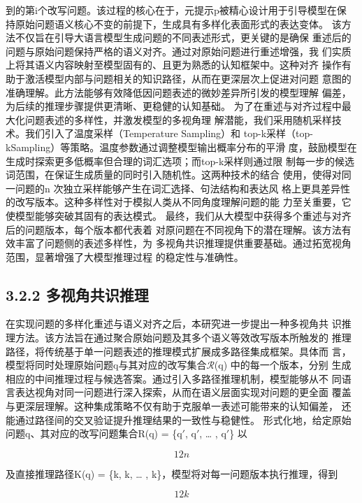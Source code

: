 \documentclass[12pt,a4paper,openright,UTF8]{ctexbook}
\begin{document}
到的第i个改写问题。该过程的核心在于，元提示p被精心设计用于引导模型在保 持原始问题语义核心不变的前提下，生成具有多样化表面形式的表达变体。 该方法不仅旨在引导大语言模型生成问题的不同表述形式，更关键的是确保 重述后的问题与原始问题保持严格的语义对齐。通过对原始问题进行重述增强，我 们实质上将其语义内容映射至模型固有的、且更为熟悉的认知框架中。这种对齐 操作有助于激活模型内部与问题相关的知识路径，从而在更深层次上促进对问题 意图的准确理解。此方法能够有效降低因问题表述的微妙差异所引发的模型理解 偏差，为后续的推理步骤提供更清晰、更稳健的认知基础。 为了在重述与对齐过程中最大化问题表述的多样性，并激发模型的多视角理 解潜能，我们采用随机采样技术。我们引入了温度采样（Temperature Sampling）和 top-k采样（top-kSampling）等策略。温度参数通过调整模型输出概率分布的平滑 度，鼓励模型在生成时探索更多低概率但合理的词汇选项；而top-k采样则通过限 制每一步的候选词范围，在保证生成质量的同时引入随机性。这两种技术的结合 使用，使得对同一问题的n 次独立采样能够产生在词汇选择、句法结构和表达风 格上更具差异性的改写版本。这种多样性对于模拟人类从不同角度理解问题的能 力至关重要，它使模型能够突破其固有的表达模式。 最终，我们从大模型中获得多个重述与对齐后的问题版本，每个版本都代表着 对原问题在不同视角下的潜在理解。该方法有效丰富了问题侧的表述多样性，为 多视角共识推理提供重要基础。通过拓宽视角范围，显著增强了大模型推理过程 的稳定性与准确性。

\subsection{3.2.2 多视角共识推理}

在实现问题的多样化重述与语义对齐之后，本研究进一步提出一种多视角共 识推理方法。该方法旨在通过聚合原始问题及其多个语义等效改写版本所触发的 推理路径，将传统基于单一问题表述的推理模式扩展成多路径集成框架。具体而 言，模型将同时处理原始问题q与其对应的改写集合$\mathcal{R}$(q) 中的每一个版本，分别 生成相应的中间推理过程与候选答案。通过引入多路径推理机制，模型能够从不 同语言表达视角对同一问题进行深入探索，从而在语义层面实现对问题的更全面 覆盖与更深层理解。这种集成策略不仅有助于克服单一表述可能带来的认知偏差， 还能通过路径间的交叉验证提升推理结果的一致性与稳健性。 形式化地，给定原始问题q、其对应的改写问题集合R(q) = \{q$'$, q$'$, … , q$'$\} 以

\begin{equation*}
12n
\end{equation*}

及直接推理路径K(q) = \{k, k, … , k\}，模型将对每一问题版本执行推理，得到

\begin{equation*}
12k
\end{equation*}
\end{document}
